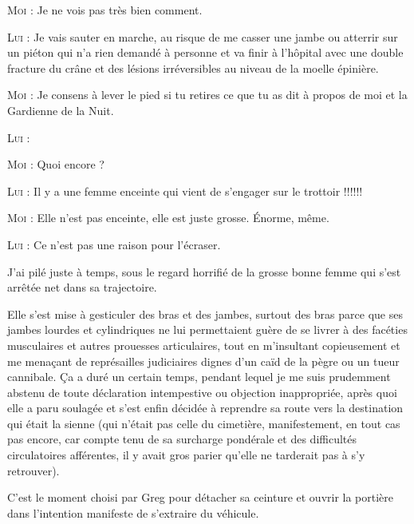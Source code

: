 \begin{dialogue}
\textsc{Moi} : Je ne vois pas très bien comment.

\textsc{Lui} : Je vais sauter en marche, au risque de me casser une jambe ou atterrir sur un piéton qui n’a rien demandé à personne et va finir à l’hôpital avec une double fracture du crâne et des lésions irréversibles au niveau de la moelle épinière.

\textsc{Moi} : Je consens à lever le pied si tu retires ce que tu as dit à propos de moi et la Gardienne de la Nuit.

\textsc{Lui} : 

\textsc{Moi} : Quoi encore ?

\textsc{Lui} : Il y a une femme enceinte qui vient de s’engager sur le trottoir !!!!!!

\textsc{Moi} : Elle n’est pas enceinte, elle est juste grosse. Énorme, même.

\textsc{Lui} : Ce n’est pas une raison pour l’écraser.

\end{dialogue}

J’ai pilé juste à temps, sous le regard horrifié de la grosse bonne femme qui s’est arrêtée net dans sa trajectoire.

Elle s’est mise à gesticuler des bras et des jambes, surtout des bras parce que ses jambes lourdes et cylindriques ne lui permettaient guère de se livrer à des facéties musculaires et autres prouesses articulaires, tout en m’insultant copieusement et me menaçant de représailles judiciaires dignes d’un caïd de la pègre ou un tueur cannibale. Ça a duré un certain temps, pendant lequel je me suis prudemment abstenu de toute déclaration intempestive ou objection inappropriée, après quoi elle a paru soulagée et s’est enfin décidée à reprendre sa route vers la destination qui était la sienne (qui n’était pas celle du cimetière, manifestement, en tout cas pas encore, car compte tenu de sa surcharge pondérale et des difficultés circulatoires afférentes, il y avait gros parier qu’elle ne tarderait pas à s’y retrouver).

C’est le moment choisi par Greg pour détacher sa ceinture et ouvrir la portière dans l’intention manifeste de s’extraire du véhicule.


